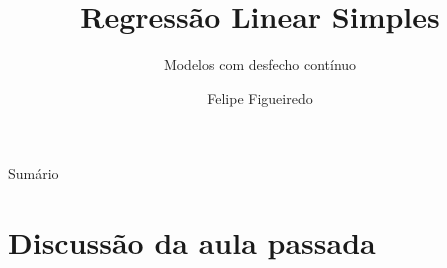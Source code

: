 \documentclass{beamer}
\title%
{Regressão Linear Simples}
\subtitle
{Modelos com desfecho contínuo} %
\author%
{Felipe Figueiredo}%
\institute[INTO] %
{Instituto Nacional de Traumatologia e Ortopedia
}
\date%
{}
\begin{document}
\begin{frame}
  \titlepage
\end{frame}

\begin{frame}{Sumário}
  \tableofcontents
\end{frame}








\section{Discussão da aula passada}
\end{document}

